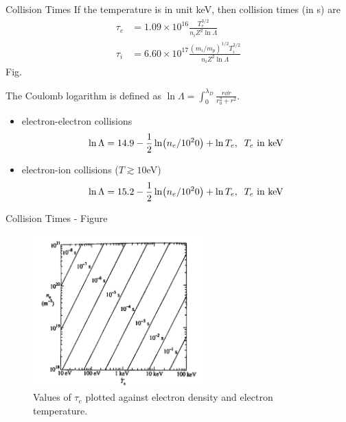\begin{frame}{Collision Times}
    If the temperature is in unit \unit{\kilo\eV}, then collision times (in \unit{\s}) are
    \begin{align}
        \tau_e & = 1.09\times10^{16}\frac{T_e^{3/2}}{n_iZ^2\ln\Lambda}                \\
        \tau_i & = 6.60\times10^{17}\frac{(m_i/m_p)^{1/2}T_i^{3/2}}{n_iZ^2\ln\Lambda}
    \end{align}
    Fig.

    The Coulomb logarithm is defined as $\ln\Lambda = \int_0^{\lambda_D} \frac{r\dd{r}}{r_0^2+r^2}$.
    \begin{itemize}
        \item electron-electron collisions
              \[ \ln\Lambda = 14.9-\frac{1}{2}\ln(n_e/10^20) + \ln T_e, \;\; \text{$T_e$ in \unit{\kilo\eV}} \]
        \item electron-ion collisions ($T\gtrsim 10$\unit{\eV})
              \[ \ln\Lambda = 15.2-\frac{1}{2}\ln(n_e/10^20) + \ln T_e, \;\; \text{$T_e$ in \unit{\kilo\eV}} \]
    \end{itemize}
\end{frame}

\begin{frame}{Collision Times - Figure}
    \begin{figure}
        \centering
        \includegraphics[width=0.6\textwidth]{figures/collision-time.png}
        \caption{Values of $\tau_e$ plotted against electron density and electron temperature.}
        \label{fig:collision-time}
    \end{figure}
\end{frame}

